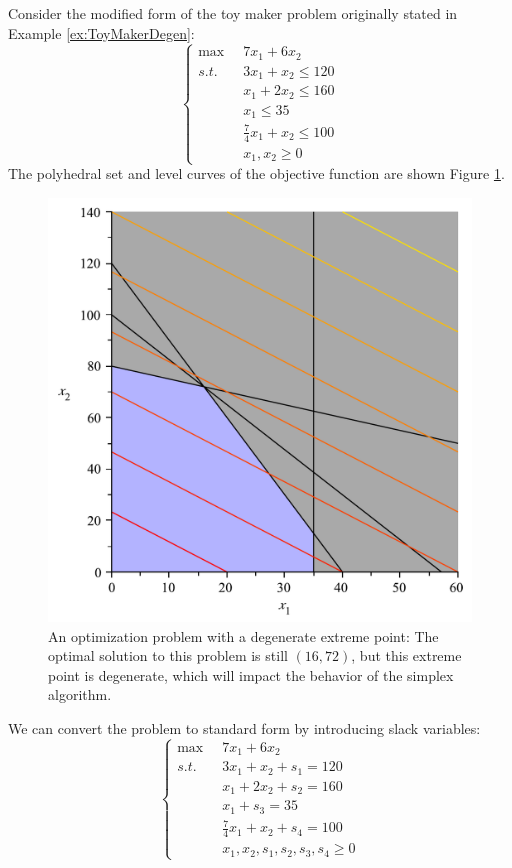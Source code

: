 \begin{example}
Consider the modified form of the toy maker problem originally stated in Example \ref{ex:ToyMakerDegen}:
\begin{equation}
\left\{
\begin{aligned}
\max\;\;&7x_1 + 6x_2\\
s.t.\;\;&3x_1 + x_2 \leq 120\\
&x_1 + 2x_2 \leq 160\\
&x_1 \leq 35\\
&\frac{7}{4}x_1+x_2 \leq 100\\
&x_1,x_2 \geq 0
\end{aligned}
\right.
\end{equation}
The polyhedral set and level curves of the objective function are shown Figure \ref{fig:DegenOptim}.
\begin{figure}[htbp]
\centering
\includegraphics[scale=0.35]{DegenOptim.pdf}
\caption{An optimization problem with a degenerate extreme point: The optimal solution to this problem is still $(16,72)$, but this extreme point is degenerate, which will impact the behavior of the simplex algorithm.}
\label{fig:DegenOptim}
\end{figure}
We can convert the problem to standard form by introducing slack variables:
\begin{equation}
\left\{
\begin{aligned}
\max\;\;&7x_1 + 6x_2\\
s.t.\;\;&3x_1 + x_2 +s_1 = 120\\
&x_1 + 2x_2 + s_2 = 160\\
&x_1 + s_3 = 35\\
&\frac{7}{4}x_1+x_2 + s_4 = 100\\
&x_1,x_2,s_1,s_2,s_3,s_4 \geq 0
\end{aligned}
\right.
\end{equation}


\end{example}
